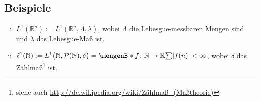 \subsection[Beispiele für $L^1$-Räume mit Lebesgue-Maß und Zählmaß]{Beispiele} %
\label{sub:42}
\begin{enumerate}[(i)]
	\item $L^1(\mathds{R}^n) := L^1(\mathds{R}^n, \Lambda, \lambda)$, wobei $\Lambda$ die Lebesgue-messbaren Mengen sind und $\lambda $ das Lebesgue-Maß 
	ist.
	\item $\ell^1(\mathds{N}) := L^1 \enbrace[\big]{\mathds{N}, \mathcal{P}(\mathds{N}), \delta} = \set[f\colon \mathds{N} \to \mathds{R}]{\sum \abs*{f(n)} < \infty } $, 
	wobei $\delta$ das Zählmaß\footnote{siehe auch \url{http://de.wikipedia.org/wiki/Zählmaß_(Maßtheorie)}} ist.
\end{enumerate}

